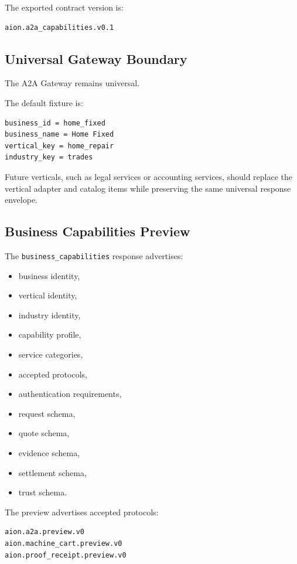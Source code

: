 The exported contract version is:

\begin{verbatim}
aion.a2a_capabilities.v0.1
\end{verbatim}

\subsection{Universal Gateway Boundary}

The A2A Gateway remains universal.

The default fixture is:

\begin{verbatim}
business_id = home_fixed
business_name = Home Fixed
vertical_key = home_repair
industry_key = trades
\end{verbatim}

Future verticals, such as legal services or accounting services, should replace the vertical adapter and catalog items while preserving the same universal response envelope.

\subsection{Business Capabilities Preview}

The \texttt{business\_capabilities} response advertises:

\begin{itemize}
  \item business identity,
  \item vertical identity,
  \item industry identity,
  \item capability profile,
  \item service categories,
  \item accepted protocols,
  \item authentication requirements,
  \item request schema,
  \item quote schema,
  \item evidence schema,
  \item settlement schema,
  \item trust schema.
\end{itemize}

The preview advertises accepted protocols:

\begin{verbatim}
aion.a2a.preview.v0
aion.machine_cart.preview.v0
aion.proof_receipt.preview.v0
\end{verbatim}

